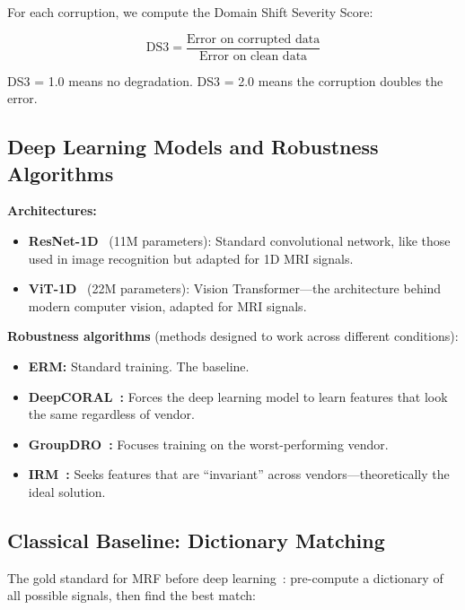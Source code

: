 \documentclass[11pt,a4paper]{article}
\begin{document}
For each corruption, we compute the Domain Shift Severity Score:

\begin{equation}
  \text{DS3} = \frac{\text{Error on corrupted data}}
    {\text{Error on clean data}}
\end{equation}

DS3 = 1.0 means no degradation. DS3 = 2.0 means the corruption doubles
the error.

\subsection{Deep Learning Models and Robustness Algorithms}

\textbf{Architectures:}
\begin{itemize}
  \item \textbf{ResNet-1D}~\cite{he2016deep} (11M parameters): Standard convolutional
    network, like those used in image recognition but adapted for 1D
    MRI signals.
  \item \textbf{ViT-1D}~\cite{dosovitskiy2021an} (22M parameters): Vision Transformer---the
    architecture behind modern computer vision, adapted for MRI signals.
\end{itemize}

\textbf{Robustness algorithms} (methods designed to work across
different conditions):
\begin{itemize}
  \item \textbf{ERM:} Standard training. The baseline.
  \item \textbf{DeepCORAL~\cite{sun2016deep}:} Forces the deep learning model to learn
    features that look the same regardless of vendor.
  \item \textbf{GroupDRO~\cite{sagawa2020distributionally}:}
    Focuses training on the worst-performing vendor.
  \item \textbf{IRM~\cite{arjovsky2019invariant}:} Seeks features that
    are ``invariant'' across vendors---theoretically the ideal solution.
\end{itemize}

\subsection{Classical Baseline: Dictionary Matching}

The gold standard for MRF before deep learning~\cite{ma2013magnetic}:
pre-compute a dictionary of all possible signals, then find the best
match:
\end{document}
